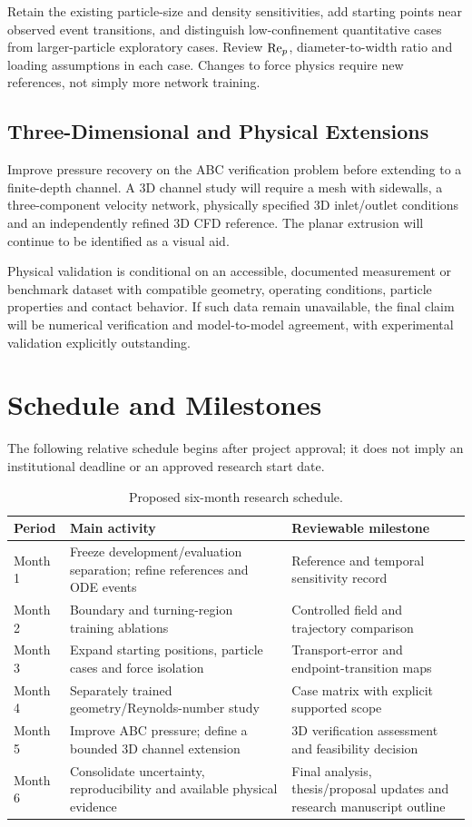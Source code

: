 Retain the existing particle-size and density sensitivities, add starting
points near observed event transitions, and distinguish low-confinement
quantitative cases from larger-particle exploratory cases. Review
$\mathrm{Re}_p$, diameter-to-width ratio and loading assumptions in each case.
Changes to force physics require new references, not simply more network
training.

\subsection{Three-Dimensional and Physical Extensions}
Improve pressure recovery on the ABC verification problem before extending
to a finite-depth channel. A 3D channel study will require a mesh with
sidewalls, a three-component velocity network, physically specified 3D
inlet/outlet conditions and an independently refined 3D CFD reference.
The planar extrusion will continue to be identified as a visual aid.

Physical validation is conditional on an accessible, documented measurement
or benchmark dataset with compatible geometry, operating conditions,
particle properties and contact behavior. If such data remain unavailable,
the final claim will be numerical verification and model-to-model agreement,
with experimental validation explicitly outstanding.

\section{Schedule and Milestones}
The following relative schedule begins after project approval; it does not
imply an institutional deadline or an approved research start date.
\begin{table}[!htbp]
\centering\small
\caption{Proposed six-month research schedule.}
\label{tab:schedule}
\begin{tabularx}{\textwidth}{@{}lYY@{}}
\toprule Period & Main activity & Reviewable milestone\\\midrule
Month 1 & Freeze development/evaluation separation; refine references and ODE events & Reference and temporal sensitivity record\\
Month 2 & Boundary and turning-region training ablations & Controlled field and trajectory comparison\\
Month 3 & Expand starting positions, particle cases and force isolation & Transport-error and endpoint-transition maps\\
Month 4 & Separately trained geometry/Reynolds-number study & Case matrix with explicit supported scope\\
Month 5 & Improve ABC pressure; define a bounded 3D channel extension & 3D verification assessment and feasibility decision\\
Month 6 & Consolidate uncertainty, reproducibility and available physical evidence & Final analysis, thesis/proposal updates and research manuscript outline\\
\bottomrule
\end{tabularx}
\end{table}

